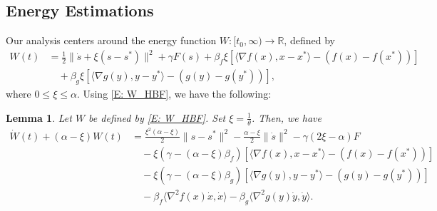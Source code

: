 \documentclass[pdflatex,sn-mathphys-num]{sn-jnl}
\theoremstyle{thmstyleone}
\newtheorem{lemma}[theorem]{Lemma}
\theoremstyle{thmstyletwo}
\theoremstyle{thmstylethree}
\newcommand{\R}{\mathbb{R}}
\begin{document}
\subsection{Energy Estimations}
Our analysis centers around the energy function $W:[t_0,\infty)\to\R$, defined by
\begin{align}\label{E: W_HBF}
W(t) 
&= \frac{1}{2}\| \dot{s} + \xi(s-s^*) \|^2 + \gamma F(s) 
 + \beta_f \xi \left[ \langle \nabla f(x), x-x^* \rangle - \left( f(x) - f(x^*) \right) \right] \nonumber\\
&\quad + \beta_g \xi \left[ \langle \nabla g(y), y-y^* \rangle - \left( g(y) - g(y^*) \right) \right],
\end{align}
where $0\le\xi\le\alpha$. Using \eqref{E: W_HBF}, we have the following:


\begin{lemma}\label{Lem: W_bound_HBF}
Let $W$ be defined by \eqref{E: W_HBF}. Set $\xi = \frac{1}{\theta}$. Then, we have
\begin{align*}
\dot{W}(t) + (\alpha-\xi)W(t)
&= \frac{\xi^2(\alpha-\xi)}{2}\| s-s^* \|^2 
  - \frac{\alpha-\xi}{2}\| \dot{s} \|^2
  - \gamma(2\xi-\alpha) F \\
&\quad - \xi\left( \gamma-(\alpha-\xi)\beta_f \right) [ \langle \nabla f(x), x-x^* \rangle - \left( f(x) - f(x^*) \right) ] \\
&\quad - \xi\left( \gamma-(\alpha-\xi)\beta_g \right) [ \langle \nabla g(y), y-y^* \rangle - \left( g(y) - g(y^*) \right) ] \\
&\quad -\beta_f \langle \nabla^2 f(x)\dot{x}, \dot{x} \rangle 
  -\beta_g \langle \nabla^2 g(y)\dot{y}, \dot{y} \rangle.
\end{align*}
\end{lemma}
\end{document}

